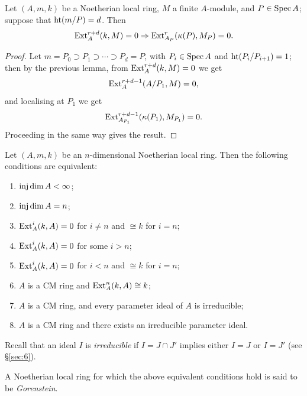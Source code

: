 \begin{lemma}\label{lem:18.4}
Let $(A, m, k)$ be a Noetherian local ring, $M$ a finite $A$-module, and
$P \in \operatorname{Spec} A$; suppose that $\operatorname{ht} (m/P) = d$. Then
\[
  \operatorname{Ext}^{r+d}_A(k, M) = 0 \Rightarrow \operatorname{Ext}^r_{A_P}(\kappa(P), M_P) = 0.
\]
\end{lemma}

\begin{proof}
Let $m = P_0 \supset P_1 \supset \cdots \supset P_d = P$, with $P_i \in \operatorname{Spec} A$ and $\operatorname{ht} (P_i/P_{i+1}) = 1$;
then by the previous lemma, from $\operatorname{Ext}^{r+d}_A(k, M) = 0$ we get
\[
  \operatorname{Ext}^{r+d-1}_A(A/P_1, M) = 0,
\]
and localising at $P_1$ we get
\[
  \operatorname{Ext}^{r+d-1}_{A_{P_1}}(\kappa(P_1), M_{P_1}) = 0.
\]
Proceeding in the same way gives the result.
\end{proof}

\begin{theorem}\label{thm:18.1}
Let $(A, m, k)$ be an $n$-dimensional Noetherian local ring.
Then the following conditions are equivalent:
\begin{enumerate}[(1)]
  \item $\operatorname{inj\,dim} A < \infty$;
  \item $\operatorname{inj\,dim} A = n$;
  \item $\operatorname{Ext}^i_A(k, A) = 0$ for $i \neq n$ and $\cong k$ for $i = n$;
  \item $\operatorname{Ext}^i_A(k, A) = 0$ for some $i > n$;
  \item $\operatorname{Ext}^i_A(k, A) = 0$ for $i < n$ and $\cong k$ for $i = n$;
  \item[($4'$)] $A$ is a CM ring and $\operatorname{Ext}^n_A(k, A) \cong k$;
  \item[($5$)] $A$ is a CM ring, and every parameter ideal of $A$ is irreducible;
  \item[($5'$)] $A$ is a CM ring and there exists an irreducible parameter ideal.
\end{enumerate}
Recall that an ideal $I$ is \emph{irreducible} if $I = J \cap J'$ implies either $I = J$ or
$I = J'$ (see \S\ref{sec:6}).
\end{theorem}

\begin{definition}
A Noetherian local ring for which the above equivalent
conditions hold is said to be \emph{Gorenstein}.
\end{definition}

